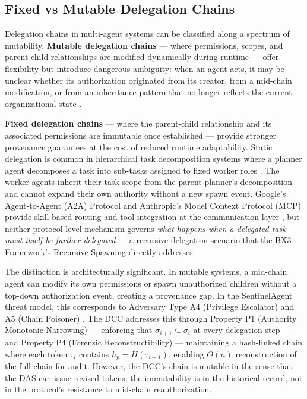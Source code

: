 \subsection{Fixed vs Mutable Delegation Chains}
\label{sec:delegation-chains}

Delegation chains in multi-agent systems can be classified along a spectrum of mutability. \textbf{Mutable delegation chains} — where permissions, scopes, and parent-child relationships are modified dynamically during runtime — offer flexibility but introduce dangerous ambiguity: when an agent acts, it may be unclear whether its authorization originated from its creator, from a mid-chain modification, or from an inheritance pattern that no longer reflects the current organizational state \cite{sentinel_agent_2026}.

\textbf{Fixed delegation chains} — where the parent-child relationship and its associated permissions are immutable once established — provide stronger provenance guarantees at the cost of reduced runtime adaptability. Static delegation is common in hierarchical task decomposition systems where a planner agent decomposes a task into sub-tasks assigned to fixed worker roles \cite{claude_code_design_2026, openai_mas_2025}. The worker agents inherit their task scope from the parent planner's decomposition and cannot expand their own authority without a new spawn event. Google's Agent-to-Agent (A2A) Protocol and Anthropic's Model Context Protocol (MCP) provide skill-based routing and tool integration at the communication layer \cite{a2a_protocol_2025, mcp_protocol_2024}, but neither protocol-level mechanism governs \emph{what happens when a delegated task must itself be further delegated} — a recursive delegation scenario that the BX3 Framework's Recursive Spawning directly addresses.

The distinction is architecturally significant. In mutable systems, a mid-chain agent can modify its own permissions or spawn unauthorized children without a top-down authorization event, creating a provenance gap. In the SentinelAgent threat model, this corresponds to Adversary Type A4 (Privilege Escalator) and A5 (Chain Poisoner) \cite[Table I]{sentinel_agent_2026}. The DCC addresses this through Property P1 (Authority Monotonic Narrowing) — enforcing that $\sigma_{i+1} \subseteq \sigma_i$ at every delegation step — and Property P4 (Forensic Reconstructibility) — maintaining a hash-linked chain where each token $\tau_i$ contains $h_p = H(\tau_{i-1})$, enabling $O(n)$ reconstruction of the full chain for audit. However, the DCC's chain is mutable in the sense that the DAS can issue revised tokens; the immutability is in the historical record, not in the protocol's resistance to mid-chain reauthorization.

